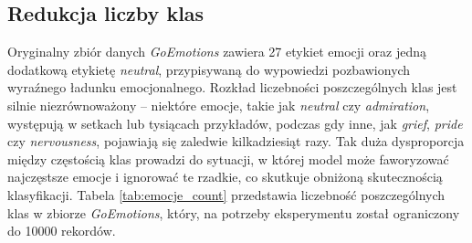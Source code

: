\documentclass[wmii, inf, mgr]{uwmthesis}
\begin{document}
\subsection{Redukcja liczby klas}\label{sekcja_redukcja_klas}
Oryginalny zbiór danych \textit{GoEmotions} zawiera 27 etykiet emocji oraz jedną dodatkową etykietę \textit{neutral}, przypisywaną do wypowiedzi pozbawionych wyraźnego ładunku emocjonalnego. Rozkład liczebności poszczególnych klas jest silnie niezrównoważony -- niektóre emocje, takie jak \textit{neutral} czy \textit{admiration}, występują w setkach lub tysiącach przykładów, podczas gdy inne, jak \textit{grief}, \textit{pride} czy \textit{nervousness}, pojawiają się zaledwie kilkadziesiąt razy. Tak duża dysproporcja między częstością klas prowadzi do sytuacji, w której model może faworyzować najczęstsze emocje i ignorować te rzadkie, co skutkuje obniżoną skutecznością klasyfikacji. Tabela \ref{tab:emocje_count} przedstawia liczebność poszczególnych klas w zbiorze \textit{GoEmotions}, który, na potrzeby eksperymentu został ograniczony do 10000 rekordów.
\end{document}
